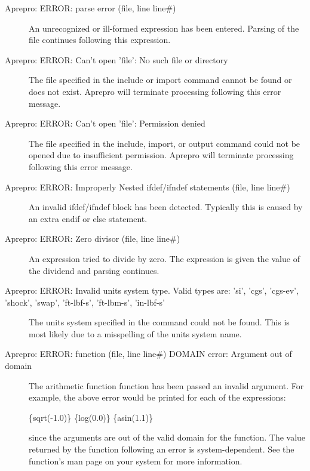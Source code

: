 \begin{description}
\item[Aprepro:  ERROR:  parse  error  (file,  line  line\#)]
An unrecognized or ill-formed expression has been entered. Parsing of
the file continues following this expression.

\item[Aprepro: ERROR: Can't open 'file': No such file or directory] The file specified
in the include or import command cannot be found or does not exist. Aprepro will terminate
processing following this error message.

\item[Aprepro: ERROR: Can't open 'file': Permission denied] The file specified in the
include, import, or output command could not be opened due to insufficient permission.
Aprepro will terminate processing following this error message.

\item[Aprepro: ERROR: Improperly Nested ifdef/ifndef statements (file, line line\#)]
An invalid ifdef/ifndef block has been detected. Typically this is caused by an
extra endif or else statement.

\item[Aprepro:  ERROR:    Zero  divisor  (file,  line  line\#)]    An expression tried
to divide by zero. The expression is given the value of the dividend and parsing continues.

\item[Aprepro: ERROR: Invalid units system type. Valid types are: 'si', 'cgs', 'cgs-ev', 'shock', 'swap', 'ft-lbf-s', 'ft-lbm-s', 'in-lbf-s']
The units system specified in the command could not be found. This
is most likely due to a misspelling of the units system name.

\item[Aprepro: ERROR: function (file, line line\#) DOMAIN error: Argument out of domain]
The arithmetic function function has been passed an invalid
argument. For example, the above error would be printed for each of
the expressions:
\begin{apinp}
\{sqrt(-1.0)\}  \{log(0.0)\}  \{asin(1.1)\}
\end{apinp}

since the arguments are out of the valid domain for the function. The
value returned by the function following an error is
system-dependent. See the function's man page on your system for more
information.


\end{description}

